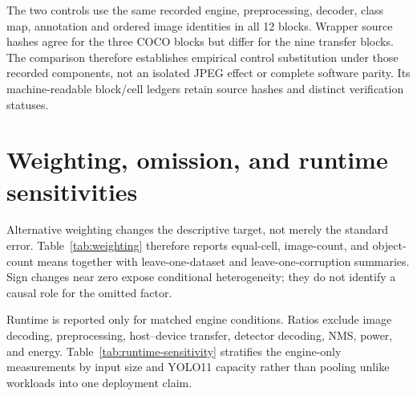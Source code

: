 \documentclass[10pt]{article}
\begin{document}
The two controls use the same recorded engine, preprocessing, decoder, class map, annotation and ordered image identities in all 12 blocks. Wrapper source hashes agree for the three COCO blocks but differ for the nine transfer blocks. The comparison therefore establishes empirical control substitution under those recorded components, not an isolated JPEG effect or complete software parity. Its machine-readable block/cell ledgers retain source hashes and distinct verification statuses.

\begin{table}[htbp]
\centering\scriptsize
\caption{Clean-control substitution from unrounded ledgers. $\delta$ and block-mean interactions are AP points. The last column records the inference-wrapper qualification; all recorded numerical component identities match.}
\label{tab:codec-interaction}
\resizebox{\textwidth}{!}{}
\end{table}

\FloatBarrier

\section{Weighting, omission, and runtime sensitivities}

Alternative weighting changes the descriptive target, not merely the standard
error. Table~\ref{tab:weighting} therefore reports equal-cell, image-count, and
object-count means together with leave-one-dataset and leave-one-corruption
summaries. Sign changes near zero expose conditional heterogeneity; they do not
identify a causal role for the omitted factor.

\begin{table}[htbp]
\centering
\caption{Weighting and leave-one-factor-out sensitivity of the 144-cell ledger.}
\label{tab:weighting}
\scriptsize
\resizebox{0.92\textwidth}{!}{}
\end{table}

Runtime is reported only for matched engine conditions. Ratios exclude image
decoding, preprocessing, host--device transfer, detector decoding, NMS, power,
and energy. Table~\ref{tab:runtime-sensitivity} stratifies the engine-only
measurements by input size and YOLO11 capacity rather than pooling unlike
workloads into one deployment claim.

\begin{table}[htbp]
\centering
\caption{Matched engine-only latency-ratio sensitivity. Entries are median
[Q1, Q3] across retained conditions.}
\label{tab:runtime-sensitivity}
\small
\resizebox{0.86\textwidth}{!}{}
\end{table}
\end{document}
